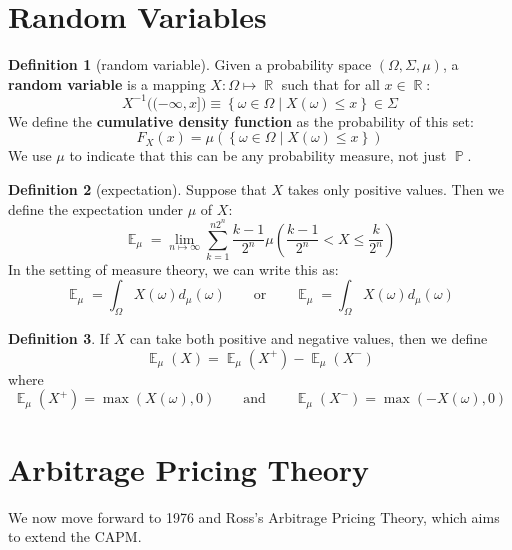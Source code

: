 \documentclass[11pt]{article}
\theoremstyle{definition}
\newtheorem{definition}{Definition}[section]
\theoremstyle{remark}
\DeclareMathOperator{\Exp}{\mathbb{E}}
\DeclareMathOperator{\Real}{\mathbb{R}}
\DeclareMathOperator{\Prob}{\mathbb{P}}
\begin{document}
\section{Random Variables}

\begin{definition}[random variable] Given a probability space $(\Omega, \Sigma, \mu)$, a {\bf random variable} is a mapping $X:\Omega \mapsto \Real$ such that for all $x \in \Real$:
$$ X^{-1}\big( (-\infty, x] \big) \equiv \left\{ \omega \in \Omega \middle| X(\omega) \leq x \right\} \in \Sigma$$
We define the {\bf cumulative density function} as the probability of this set: $$F_X(x) = \mu\left(\left\{ \omega \in \Omega \middle| X(\omega) \leq x\right\}\right)$$
We use $\mu$ to indicate that this can be any probability measure, not just $\Prob$.
\end{definition}

\begin{definition}[expectation] Suppose that $X$ takes only positive values. Then we define the expectation under $\mu$ of $X$:
$$\Exp_\mu = \lim_{n \mapsto \infty} \sum_{k=1}^{n 2^n} \frac{k-1}{2^n} \mu\left( \frac{k-1}{2^n} < X \leq \frac{k}{2^n} \right)$$
In the setting of measure theory, we can write this as:
$$\Exp_\mu = \int_\Omega X(\omega) d_\mu(\omega) \qquad \text{or} \qquad \Exp_\mu = \int_\Omega X(\omega) d_\mu(\omega)$$
\end{definition}

\begin{definition} If $X$ can take both positive and negative values, then we define 
$$\Exp_\mu (X) = \Exp_\mu (X^+) - \Exp_\mu (X^-)$$
where 
$$\Exp_\mu (X^+) = \max(X(\omega), 0) \qquad \text{and} \qquad \Exp_\mu (X^-) = \max(-X(\omega), 0)$$

\end{definition}


\section{Arbitrage Pricing Theory}
We now move forward to 1976 and Ross's Arbitrage Pricing Theory, which aims to extend the CAPM. 
\end{document}
